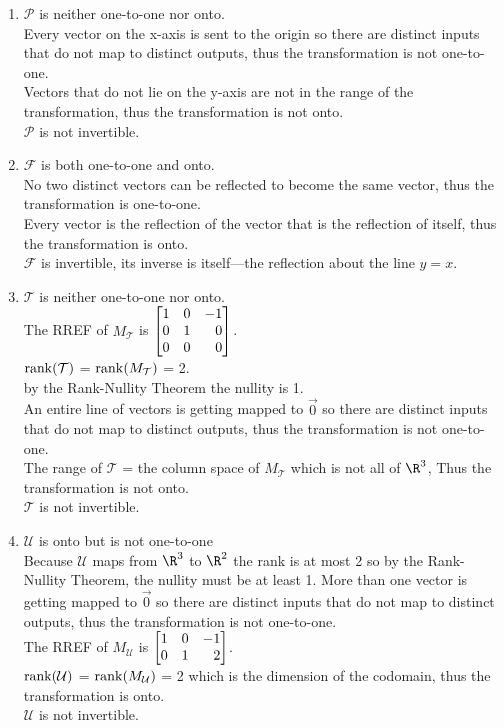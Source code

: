 \begin{exercises}
\begin{problist}
\begin{solution}
\begin{enumerate}
				\item
				$\mathcal P$ is neither one-to-one nor onto.\\
				Every vector on the x-axis is sent to the origin so there are distinct
				inputs that do not map to distinct outputs,
				thus the transformation is not one-to-one.\\
				Vectors that do not lie on the y-axis are not in the range of the
				transformation,
				thus the transformation is not onto.\\
				$\mathcal P$ is not invertible.

				\item
				$\mathcal F$ is both one-to-one and onto.\\
				No two distinct vectors can be reflected to become the same vector,
				thus the transformation is one-to-one.\\
				Every vector is the reflection of the vector that is the reflection of
				itself,
				thus the transformation is onto.\\
				$\mathcal F$ is invertible, its inverse is itself---the reflection about
				the line $y=x$.

				\item
				$\mathcal T$ is neither one-to-one nor onto.\\
				The RREF of $M_{\mathcal T}$ is $\mat{1&0&-1\\0&1&0\\0&0&0}$.\\
				$\operatorname{rank}(\mathcal T)$ = $\operatorname{rank}(M_{\mathcal T})$ = 2.\\
				by the Rank-Nullity Theorem the nullity is 1.\\
				An entire line of vectors is getting mapped to
				$\vec{0}$ so there are distinct inputs that do not map to distinct
				outputs,
				thus the transformation is not one-to-one.\\
				The range of $\mathcal T$ = the column space of $M_{\mathcal T}$
				which is not all of $\R^{3}$,
				Thus the transformation is not onto.\\
				$\mathcal T$ is not invertible.

				\item
				$\mathcal U$ is onto but is not one-to-one\\
				Because $\mathcal U$ maps from $\R^{3}$ to $\R^{2}$ the rank is at most
				2 so by the Rank-Nullity Theorem, the nullity must be at least 1. More
				than one vector is getting mapped to $\vec{0}$ so there are distinct
				inputs that do not map to distinct outputs,
				thus the transformation is not one-to-one.\\
				The RREF of $M_{\mathcal U}$ is $\mat{1&0&-1\\0&1&2}$.\\
				$\operatorname{rank}(\mathcal U)$ = $\operatorname{rank}(M_{\mathcal U})$ = 2 which is
				the dimension of the codomain,
				thus the transformation is onto.\\
				$\mathcal U$ is not invertible.


\end{enumerate}
\end{solution}
\end{problist}
\end{exercises}
